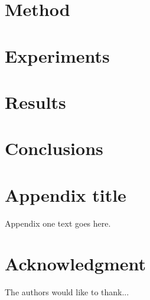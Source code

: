 \documentclass[journal,onecolumn]{IEEEtran}
\begin{document}
\section{Method}
\label{sec:method}

\section{Experiments}
\label{sec:experiments}

\section{Results}
\label{sec:results}

\section{Conclusions}
\label{sec:conclusions}


\appendices
\section{Appendix title}
Appendix one text goes here.


\section*{Acknowledgment}


The authors would like to thank...


\ifCLASSOPTIONcaptionsoff
  \newpage
\fi





%
%
%


\end{document}
